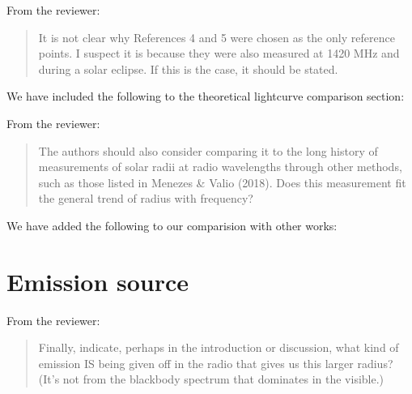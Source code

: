 \documentclass{article}
\begin{document}
From the reviewer:

\begin{quote}
  It is not clear why References 4 and 5 were chosen as the only reference points.
  I suspect it is because they were also measured at 1420 MHz and during a solar eclipse. If this is the case, it should be stated.
\end{quote}

\noindent We have included the following to the theoretical lightcurve comparison section:

\begin{quote}
  
\end{quote}

\noindent From the reviewer:

\begin{quote}
  The authors should also consider comparing it to the long history of measurements of solar radii at radio wavelengths through other methods, such as those listed in Menezes \& Valio (2018).
  Does this measurement fit the general trend of radius with frequency?
\end{quote}

\noindent We have added the following to our comparision with other works:

\begin{quote}
  
\end{quote}

\section{Emission source}

\noindent From the reviewer:

\begin{quote}
  Finally, indicate, perhaps in the introduction or discussion, what kind of emission IS being given off in the radio that gives us this larger radius? (It’s not from the blackbody spectrum that dominates in the visible.)
\end{quote}
  




\end{document}
